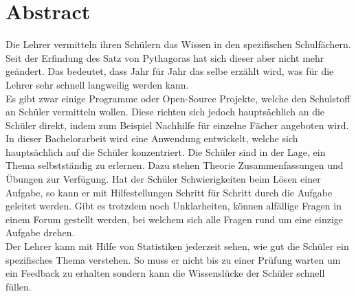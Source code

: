 \afterpage{\blankpage}
\section*{Abstract}
Die Lehrer vermitteln ihren Schülern das Wissen in den spezifischen Schulfächern. Seit der Erfindung des Satz von Pythagoras hat sich dieser aber nicht mehr geändert. Das bedeutet, dass Jahr für Jahr das selbe erzählt wird, was für die Lehrer sehr schnell langweilig werden kann. \\

Es gibt zwar einige Programme oder Open-Source Projekte, welche den Schulstoff an Schüler vermitteln wollen. Diese richten sich jedoch hauptsächlich an die Schüler direkt, indem zum Beispiel Nachhilfe für einzelne Fächer angeboten wird.  \\

In dieser Bachelorarbeit wird eine Anwendung entwickelt, welche sich hauptsächlich auf die Schüler konzentriert. Die Schüler sind in der Lage, ein Thema selbstständig zu erlernen. Dazu stehen Theorie Zusammenfassungen und Übungen zur Verfügung. Hat der Schüler Schwierigkeiten beim Lösen einer Aufgabe, so kann er mit Hilfestellungen Schritt für Schritt durch die Aufgabe geleitet werden. Gibt es trotzdem noch Unklarheiten, können alfällige Fragen in einem Forum gestellt werden, bei welchem sich alle Fragen rund um eine einzige Aufgabe drehen. \\

Der Lehrer kann mit Hilfe von Statistiken jederzeit sehen, wie gut die Schüler ein spezifisches Thema verstehen. So muss er nicht bis zu einer Prüfung warten um ein Feedback zu erhalten sondern kann die Wissenslücke der Schüler schnell füllen.

\newpage